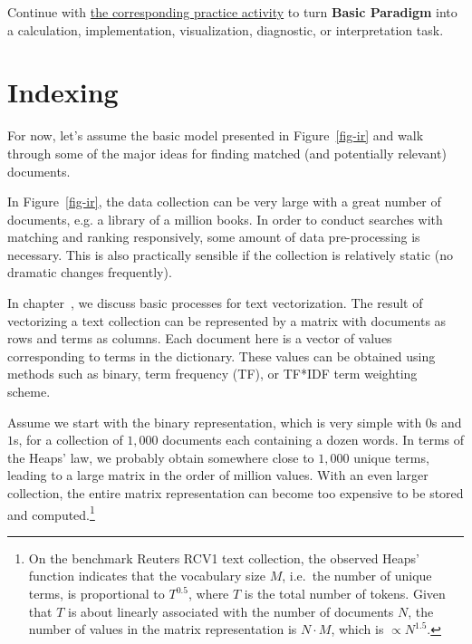 \documentclass[
  letterpaper,
]{scrbook}
\begin{document}
\begin{tcolorbox}[enhanced jigsaw, arc=.35mm, bottomrule=.15mm, bottomtitle=1mm, breakable, colback=white, colbacktitle=quarto-callout-tip-color!10!white, colframe=quarto-callout-tip-color-frame, coltitle=black, left=2mm, leftrule=.75mm, opacityback=0, opacitybacktitle=0.6, rightrule=.15mm, title=\textcolor{quarto-callout-tip-color}{\faLightbulb}\hspace{0.5em}{Put it into practice}, titlerule=0mm, toprule=.15mm, toptitle=1mm]

Continue with \hyperref[sec-pr-12-basic-paradigm]{the corresponding
practice activity} to turn \textbf{Basic Paradigm} into a calculation,
implementation, visualization, diagnostic, or interpretation task.

\end{tcolorbox}

\section{Indexing}\label{indexing}

For now, let's assume the basic model presented in Figure~\ref{fig-ir}
and walk through some of the major ideas for finding matched (and
potentially relevant) documents.

In Figure~\ref{fig-ir}, the data collection can be very large with a
great number of documents, e.g. a library of a million books. In order
to conduct searches with matching and ranking responsively, some amount
of data pre-processing is necessary. This is also practically sensible
if the collection is relatively static (no dramatic changes frequently).

In chapter~, we discuss basic processes for text vectorization. The
result of vectorizing a text collection can be represented by a matrix
with documents as rows and terms as columns. Each document here is a
vector of values corresponding to terms in the dictionary. These values
can be obtained using methods such as binary, term frequency (TF), or
TF*IDF term weighting scheme.

Assume we start with the binary representation, which is very simple
with \(0\)s and \(1\)s, for a collection of \(1,000\) documents each
containing a dozen words. In terms of the Heaps' law, we probably obtain
somewhere close to \(1,000\) unique terms, leading to a large matrix in
the order of million values. With an even larger collection, the entire
matrix representation can become too expensive to be stored and
computed.\footnote{On the benchmark Reuters RCV1 text collection, the
  observed Heaps' function indicates that the vocabulary size \(M\),
  i.e.~the number of unique terms, is proportional to \(T^{0.5}\), where
  \(T\) is the total number of tokens. Given that \(T\) is about
  linearly associated with the number of documents \(N\), the number of
  values in the matrix representation is \(N \cdot M\), which is
  \(\propto N^{1.5}\).}
\end{document}
